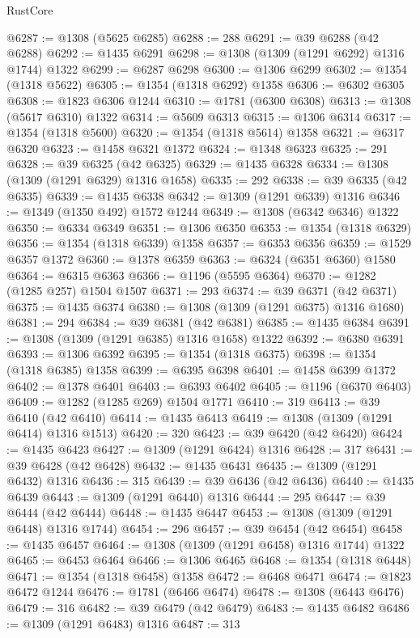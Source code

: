 \begin{lexlean}{RustCore}
\begin{coremodule}
@6287 := @1308 (@5625 @6285)
@6288 := 288
@6291 := @39 @6288 (@42 @6288)
@6292 := @1435 @6291
@6298 := @1308 (@1309 (@1291 @6292) @1316 @1744) @1322
@6299 := @6287 @6298
@6300 := @1306 @6299
@6302 := @1354 (@1318 @5622)
@6305 := @1354 (@1318 @6292) @1358
@6306 := @6302 @6305
@6308 := @1823 @6306 @1244
@6310 := @1781 (@6300 @6308)
@6313 := @1308 (@5617 @6310) @1322
@6314 := @5609 @6313
@6315 := @1306 @6314
@6317 := @1354 (@1318 @5600)
@6320 := @1354 (@1318 @5614) @1358
@6321 := @6317 @6320
@6323 := @1458 @6321 @1372
@6324 := @1348 @6323
@6325 := 291
@6328 := @39 @6325 (@42 @6325)
@6329 := @1435 @6328
@6334 := @1308 (@1309 (@1291 @6329) @1316 @1658)
@6335 := 292
@6338 := @39 @6335 (@42 @6335)
@6339 := @1435 @6338
@6342 := @1309 (@1291 @6339) @1316
@6346 := @1349 (@1350 @492) @1572 @1244
@6349 := @1308 (@6342 @6346) @1322
@6350 := @6334 @6349
@6351 := @1306 @6350
@6353 := @1354 (@1318 @6329)
@6356 := @1354 (@1318 @6339) @1358
@6357 := @6353 @6356
@6359 := @1529 @6357 @1372
@6360 := @1378 @6359
@6363 := @6324 (@6351 @6360) @1580
@6364 := @6315 @6363
@6366 := @1196 (@5595 @6364)
@6370 := @1282 (@1285 @257) @1504 @1507
@6371 := 293
@6374 := @39 @6371 (@42 @6371)
@6375 := @1435 @6374
@6380 := @1308 (@1309 (@1291 @6375) @1316 @1680)
@6381 := 294
@6384 := @39 @6381 (@42 @6381)
@6385 := @1435 @6384
@6391 := @1308 (@1309 (@1291 @6385) @1316 @1658) @1322
@6392 := @6380 @6391
@6393 := @1306 @6392
@6395 := @1354 (@1318 @6375)
@6398 := @1354 (@1318 @6385) @1358
@6399 := @6395 @6398
@6401 := @1458 @6399 @1372
@6402 := @1378 @6401
@6403 := @6393 @6402
@6405 := @1196 (@6370 @6403)
@6409 := @1282 (@1285 @269) @1504 @1771
@6410 := 319
@6413 := @39 @6410 (@42 @6410)
@6414 := @1435 @6413
@6419 := @1308 (@1309 (@1291 @6414) @1316 @1513)
@6420 := 320
@6423 := @39 @6420 (@42 @6420)
@6424 := @1435 @6423
@6427 := @1309 (@1291 @6424) @1316
@6428 := 317
@6431 := @39 @6428 (@42 @6428)
@6432 := @1435 @6431
@6435 := @1309 (@1291 @6432) @1316
@6436 := 315
@6439 := @39 @6436 (@42 @6436)
@6440 := @1435 @6439
@6443 := @1309 (@1291 @6440) @1316
@6444 := 295
@6447 := @39 @6444 (@42 @6444)
@6448 := @1435 @6447
@6453 := @1308 (@1309 (@1291 @6448) @1316 @1744)
@6454 := 296
@6457 := @39 @6454 (@42 @6454)
@6458 := @1435 @6457
@6464 := @1308 (@1309 (@1291 @6458) @1316 @1744) @1322
@6465 := @6453 @6464
@6466 := @1306 @6465
@6468 := @1354 (@1318 @6448)
@6471 := @1354 (@1318 @6458) @1358
@6472 := @6468 @6471
@6474 := @1823 @6472 @1244
@6476 := @1781 (@6466 @6474)
@6478 := @1308 (@6443 @6476)
@6479 := 316
@6482 := @39 @6479 (@42 @6479)
@6483 := @1435 @6482
@6486 := @1309 (@1291 @6483) @1316
@6487 := 313

\end{coremodule}
\end{lexlean}
